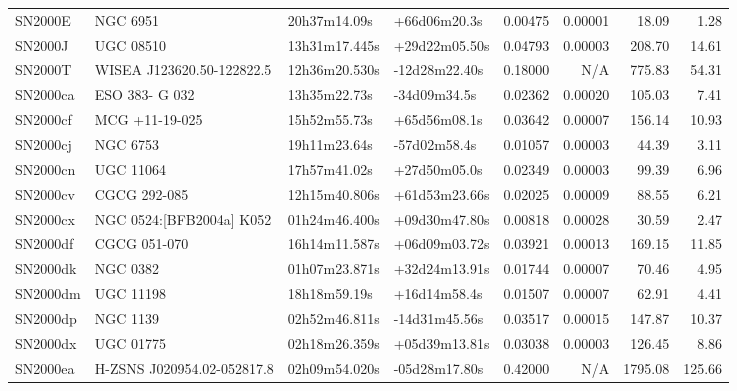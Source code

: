 \begin{longtable}{llllrrrr}
SN2000E          &                        NGC 6951 &    20h37m14.09s &    +66d06m20.3s &  0.00475 &  0.00001 &    18.09 &        1.28 \\
SN2000J          &                       UGC 08510 &   13h31m17.445s &   +29d22m05.50s &  0.04793 &  0.00003 &   208.70 &       14.61 \\
SN2000T          &       WISEA J123620.50-122822.5 &   12h36m20.530s &   -12d28m22.40s &  0.18000 &      N/A &   775.83 &       54.31 \\
SN2000ca         &                  ESO 383- G 032 &    13h35m22.73s &    -34d09m34.5s &  0.02362 &  0.00020 &   105.03 &        7.41 \\
SN2000cf         &                  MCG +11-19-025 &    15h52m55.73s &    +65d56m08.1s &  0.03642 &  0.00007 &   156.14 &       10.93 \\
SN2000cj         &                        NGC 6753 &    19h11m23.64s &    -57d02m58.4s &  0.01057 &  0.00003 &    44.39 &        3.11 \\
SN2000cn         &                       UGC 11064 &    17h57m41.02s &    +27d50m05.0s &  0.02349 &  0.00003 &    99.39 &        6.96 \\
SN2000cv         &                    CGCG 292-085 &   12h15m40.806s &   +61d53m23.66s &  0.02025 &  0.00009 &    88.55 &        6.21 \\
SN2000cx         &        NGC 0524:[BFB2004a] K052 &   01h24m46.400s &   +09d30m47.80s &  0.00818 &  0.00028 &    30.59 &        2.47 \\
SN2000df         &                    CGCG 051-070 &   16h14m11.587s &   +06d09m03.72s &  0.03921 &  0.00013 &   169.15 &       11.85 \\
SN2000dk         &                        NGC 0382 &   01h07m23.871s &   +32d24m13.91s &  0.01744 &  0.00007 &    70.46 &        4.95 \\
SN2000dm         &                       UGC 11198 &    18h18m59.19s &    +16d14m58.4s &  0.01507 &  0.00007 &    62.91 &        4.41 \\
SN2000dp         &                        NGC 1139 &   02h52m46.811s &   -14d31m45.56s &  0.03517 &  0.00015 &   147.87 &       10.37 \\
SN2000dx         &                       UGC 01775 &   02h18m26.359s &   +05d39m13.81s &  0.03038 &  0.00003 &   126.45 &        8.86 \\
SN2000ea         &      H-ZSNS J020954.02-052817.8 &   02h09m54.020s &   -05d28m17.80s &  0.42000 &      N/A &  1795.08 &      125.66 \\

\end{longtable}
